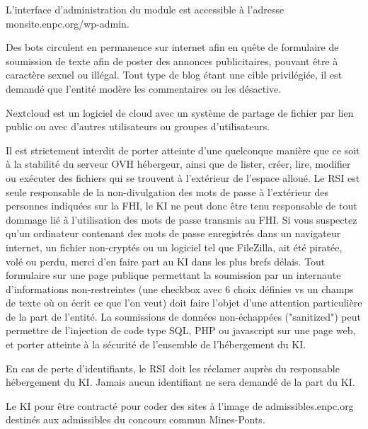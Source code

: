 \documentclass{ki019}
\begin{document}
L'interface d'administration du module est accessible à l'adresse monsite.enpc.org/wp-admin.

Des bots circulent en permanence sur internet afin en quête de formulaire de soumission de texte afin de poster des annonces publicitaires, pouvant être à caractère sexuel ou illégal. Tout type de blog étant une cible privilégiée, il est demandé que l'entité modère les commentaires ou les désactive.


Nextcloud est un logiciel de cloud avec un système de partage de fichier par lien public ou avec d'autres utilisateurs ou groupes d'utilisateurs.



Il est strictement interdit de porter atteinte d'une quelconque manière que ce soit à la stabilité du serveur OVH hébergeur, ainsi que de lister, créer, lire, modifier ou exécuter des fichiers qui se trouvent à l'extérieur de l'espace alloué.
Le RSI est seule responsable de la non-divulgation des mots de passe à l'extérieur des personnes indiquées sur la FHI, le KI ne peut donc être tenu responsable de tout dommage lié à l'utilisation des mots de passe transmis au FHI. Si vous suspectez qu'un ordinateur contenant des mots de passe enregistrés dans un navigateur internet, un fichier non-cryptés ou un logiciel tel que FileZilla, ait été piratée, volé ou perdu, merci d'en faire part au KI dans les plus brefs délais.
Tout formulaire sur une page publique permettant la soumission par un internaute d'informations non-restreintes (une checkbox avec 6 choix définies vs un champs de texte où on écrit ce que l'on veut) doit faire l'objet d'une attention particulière de la part de l'entité. La soumissions de données non-échappées ("sanitized") peut permettre de l'injection de code type SQL, PHP ou javascript sur une page web, et porter atteinte à la sécurité de l'ensemble de l'hébergement du KI.


En cas de perte d'identifiants, le RSI doit les réclamer auprès du responsable hébergement du KI. Jamais aucun identifiant ne sera demandé de la part du KI.



Le KI pour être contracté pour coder des sites à l'image de admissibles.enpc.org destinés aux admissibles du concours commun Mines-Ponts.
\end{document}
